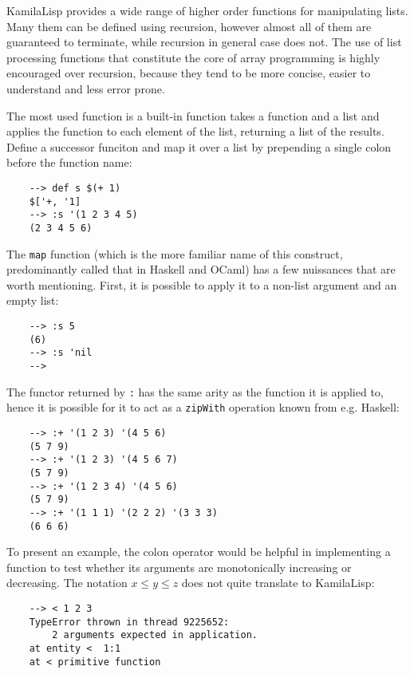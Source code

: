 KamilaLisp provides a wide range of higher order functions for manipulating lists. Many them can be defined using recursion, however almost all of them are guaranteed to terminate, while recursion in general case does not. The use of list processing functions that constitute the core of array programming is highly encouraged over recursion, because they tend to be more concise, easier to understand and less error prone.

The most used function is a built-in function takes a function and a list and applies the function to each element of the list, returning a list of the results. Define a successor funciton and map it over a list by prepending a single colon before the function name:

\begin{Verbatim}
    --> def s $(+ 1)
    $['+, '1]
    --> :s '(1 2 3 4 5)
    (2 3 4 5 6)
\end{Verbatim}

The \verb|map| function (which is the more familiar name of this construct, predominantly called that in Haskell and OCaml) has a few nuissances that are worth mentioning. First, it is possible to apply it to a non-list argument and an empty list:

\begin{Verbatim}
    --> :s 5
    (6)
    --> :s 'nil
    -->
\end{Verbatim}

The functor returned by \verb|:| has the same arity as the function it is applied to, hence it is possible for it to act as a \verb|zipWith| operation known from e.g. Haskell:

\begin{Verbatim}
    --> :+ '(1 2 3) '(4 5 6)
    (5 7 9)
    --> :+ '(1 2 3) '(4 5 6 7)
    (5 7 9)
    --> :+ '(1 2 3 4) '(4 5 6)
    (5 7 9)
    --> :+ '(1 1 1) '(2 2 2) '(3 3 3)
    (6 6 6)
\end{Verbatim}

To present an example, the colon operator would be helpful in implementing a function to test whether its arguments are monotonically increasing or decreasing. The notation $x \le y \le z$ does not quite translate to KamilaLisp:

\begin{Verbatim}
    --> < 1 2 3
    TypeError thrown in thread 9225652:
        2 arguments expected in application.
    at entity <  1:1
    at < primitive function
\end{Verbatim}

